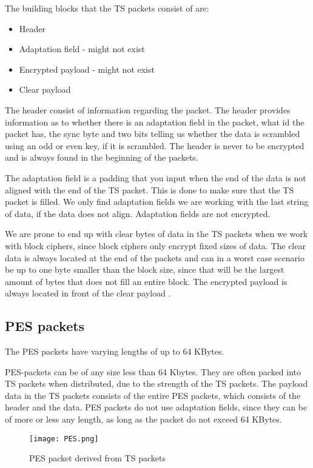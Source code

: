 The building blocks that the TS packets consist of are:

\begin{itemize}
\item Header
\item Adaptation field - might not exist
\item Encrypted payload - might not exist
\item Clear payload
\end{itemize}

The header consist of information regarding the packet. The header provides 
information as to whether there is an adaptation field in the packet, what id 
the packet has, the sync byte and two bits telling us whether the data is 
scrambled using an odd or even key, if it is scrambled. The header is never to 
be encrypted and is always found in the beginning of the packets.

The adaptation field is a padding that you input when the end of the data is not 
aligned with the end of the TS packet. This is done to make sure that the TS 
packet is filled. We only find adaptation fields we are working with the last 
string of data, if the data does not align. Adaptation fields are not encrypted.

We are prone to end up with clear bytes of data in the TS packets when we work 
with block ciphers, since block ciphers only encrypt fixed sizes of data. The 
clear data is always located at the end of the packets and can in a worst case 
scenario be up to one byte smaller than the block size, since that will be the 
largest amount of bytes that does not fill an entire block. The encrypted 
payload is always located in front of the clear payload 
\cite[pp. 10--11]{DVB:2013}.

\subsection{PES packets}
The PES packets have varying lengths of up to 64 KBytes.

PES-packets can be of any size less than 64 Kbytes. They are often packed into 
TS packets when distributed, due to the strength of the TS packets. The payload
data in the TS packets consists of the entire PES packets, which consists of the 
header and the data. PES packets do not use adaptation fields, since they can be 
of more or less any length, as long as the packet do not exceed 64 KBytes.

\begin{figure}
  \texttt{[image: PES.png]}
  \label{img:PES}
  \caption{PES packet derived from TS packets}
\end{figure}

